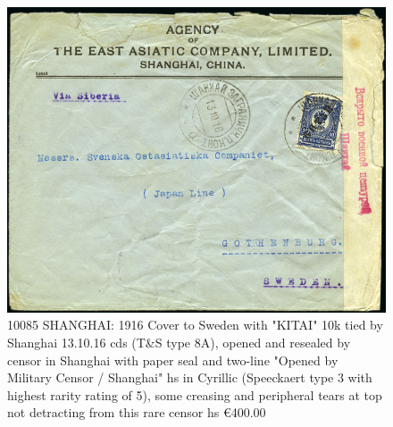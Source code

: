\begin{figure}[htbp]
\centering
\includegraphics[width=.95\textwidth]{../russian-post-offices-in-china/10085.jpg}
\caption{
 10085	SHANGHAI: 1916 Cover to Sweden with "KITAI" 10k tied by Shanghai 13.10.16 
 cds (T\&S type 8A), opened and resealed by censor in Shanghai with paper 
 seal and two-line "Opened by Military Censor / Shanghai" hs in Cyrillic 
 (Speeckaert type 3 with highest rarity rating of 5), some creasing and 
 peripheral tears at top not detracting from this rare censor hs
\euro 400.00 
}  
\end{figure}

        